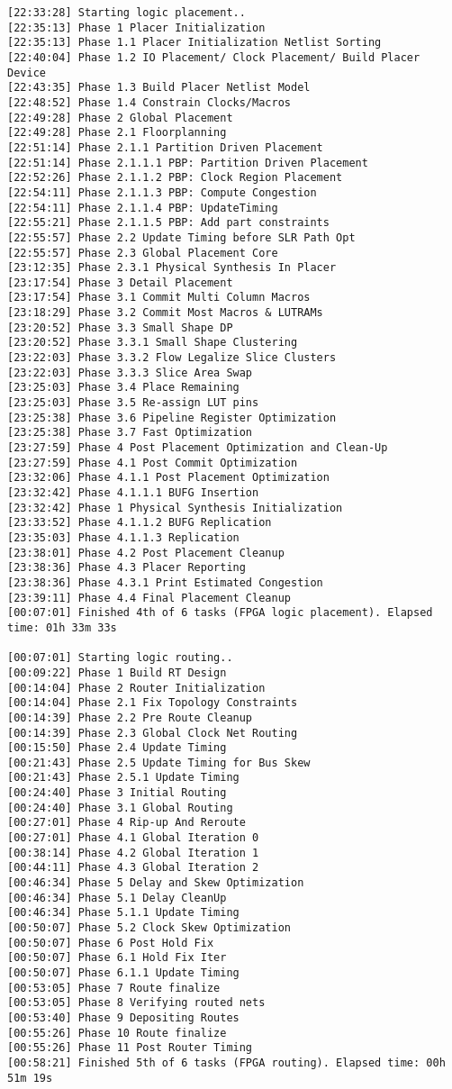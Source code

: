 \begin{lstlisting}[label=code:log_file, caption=Содержимое log-файла, basicstyle=\tiny]
[22:33:28] Starting logic placement..
[22:35:13] Phase 1 Placer Initialization
[22:35:13] Phase 1.1 Placer Initialization Netlist Sorting
[22:40:04] Phase 1.2 IO Placement/ Clock Placement/ Build Placer Device
[22:43:35] Phase 1.3 Build Placer Netlist Model
[22:48:52] Phase 1.4 Constrain Clocks/Macros
[22:49:28] Phase 2 Global Placement
[22:49:28] Phase 2.1 Floorplanning
[22:51:14] Phase 2.1.1 Partition Driven Placement
[22:51:14] Phase 2.1.1.1 PBP: Partition Driven Placement
[22:52:26] Phase 2.1.1.2 PBP: Clock Region Placement
[22:54:11] Phase 2.1.1.3 PBP: Compute Congestion
[22:54:11] Phase 2.1.1.4 PBP: UpdateTiming
[22:55:21] Phase 2.1.1.5 PBP: Add part constraints
[22:55:57] Phase 2.2 Update Timing before SLR Path Opt
[22:55:57] Phase 2.3 Global Placement Core
[23:12:35] Phase 2.3.1 Physical Synthesis In Placer
[23:17:54] Phase 3 Detail Placement
[23:17:54] Phase 3.1 Commit Multi Column Macros
[23:18:29] Phase 3.2 Commit Most Macros & LUTRAMs
[23:20:52] Phase 3.3 Small Shape DP
[23:20:52] Phase 3.3.1 Small Shape Clustering
[23:22:03] Phase 3.3.2 Flow Legalize Slice Clusters
[23:22:03] Phase 3.3.3 Slice Area Swap
[23:25:03] Phase 3.4 Place Remaining
[23:25:03] Phase 3.5 Re-assign LUT pins
[23:25:38] Phase 3.6 Pipeline Register Optimization
[23:25:38] Phase 3.7 Fast Optimization
[23:27:59] Phase 4 Post Placement Optimization and Clean-Up
[23:27:59] Phase 4.1 Post Commit Optimization
[23:32:06] Phase 4.1.1 Post Placement Optimization
[23:32:42] Phase 4.1.1.1 BUFG Insertion
[23:32:42] Phase 1 Physical Synthesis Initialization
[23:33:52] Phase 4.1.1.2 BUFG Replication
[23:35:03] Phase 4.1.1.3 Replication
[23:38:01] Phase 4.2 Post Placement Cleanup
[23:38:36] Phase 4.3 Placer Reporting
[23:38:36] Phase 4.3.1 Print Estimated Congestion
[23:39:11] Phase 4.4 Final Placement Cleanup
[00:07:01] Finished 4th of 6 tasks (FPGA logic placement). Elapsed time: 01h 33m 33s 

[00:07:01] Starting logic routing..
[00:09:22] Phase 1 Build RT Design
[00:14:04] Phase 2 Router Initialization
[00:14:04] Phase 2.1 Fix Topology Constraints
[00:14:39] Phase 2.2 Pre Route Cleanup
[00:14:39] Phase 2.3 Global Clock Net Routing
[00:15:50] Phase 2.4 Update Timing
[00:21:43] Phase 2.5 Update Timing for Bus Skew
[00:21:43] Phase 2.5.1 Update Timing
[00:24:40] Phase 3 Initial Routing
[00:24:40] Phase 3.1 Global Routing
[00:27:01] Phase 4 Rip-up And Reroute
[00:27:01] Phase 4.1 Global Iteration 0
[00:38:14] Phase 4.2 Global Iteration 1
[00:44:11] Phase 4.3 Global Iteration 2
[00:46:34] Phase 5 Delay and Skew Optimization
[00:46:34] Phase 5.1 Delay CleanUp
[00:46:34] Phase 5.1.1 Update Timing
[00:50:07] Phase 5.2 Clock Skew Optimization
[00:50:07] Phase 6 Post Hold Fix
[00:50:07] Phase 6.1 Hold Fix Iter
[00:50:07] Phase 6.1.1 Update Timing
[00:53:05] Phase 7 Route finalize
[00:53:05] Phase 8 Verifying routed nets
[00:53:40] Phase 9 Depositing Routes
[00:55:26] Phase 10 Route finalize
[00:55:26] Phase 11 Post Router Timing
[00:58:21] Finished 5th of 6 tasks (FPGA routing). Elapsed time: 00h 51m 19s 


\end{lstlisting}
